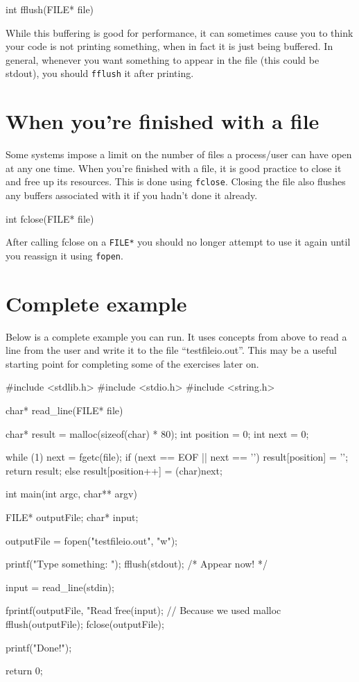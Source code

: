\begin{codeinline}
int fflush(FILE* file)
\end{codeinline}

While this buffering is good for performance, it can sometimes cause you to think your code is not printing something, when in fact it is just being buffered.
In general, whenever you want something to appear in the file (this could be stdout), you should \texttt{fflush} it after printing.

\section{When you're finished with a file}

Some systems impose a limit on the number of files a process/user can have open at any one time.
When you're finished with a file, it is good practice to close it and free up its resources.
This is done using \texttt{fclose}.
Closing the file also flushes any buffers associated with it if you hadn't done it already.

\begin{codeinline}
int fclose(FILE* file)
\end{codeinline}

After calling fclose on a \texttt{FILE*} you should no longer attempt to use it again until you reassign it using \texttt{fopen}.

\section{Complete example}

Below is a complete example you can run. 
It uses concepts from above to read a line from the user and write it to the file ``testfileio.out''.
This may be a useful starting point for completing some of the exercises later on.

\begin{codeblock}
#include <stdlib.h>
#include <stdio.h>
#include <string.h>

char* read_line(FILE* file)
{
    char* result = malloc(sizeof(char) * 80);
    int position = 0;
    int next = 0;

    while (1) {
        next = fgetc(file);
        if (next == EOF || next == '\n') {
            result[position] = '\0';
            return result;
        } else {
            result[position++] = (char)next;
        }
    }
}

int main(int argc, char** argv)
{
    FILE* outputFile;
    char* input;

    outputFile = fopen("testfileio.out", "w");

    printf("Type something: ");
    fflush(stdout); /* Appear now! */

    input = read_line(stdin);

    fprintf(outputFile, "Read \"%
    free(input); // Because we used malloc
    fflush(outputFile);
    fclose(outputFile);

    printf("Done!\n");

    return 0;
}
\end{codeblock}
